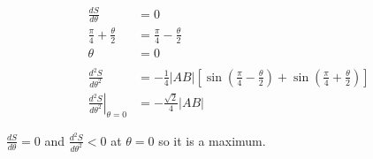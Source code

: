 \documentclass{article}
\begin{document}
\begin{align*}
  \frac{d S}{d \theta}                                 & = 0                                                                                                                                                        \\
  \frac{\pi}{4} + \frac{\theta}{2}                     & = \frac{\pi}{4} - \frac{\theta}{2}                                                                                                                         \\
  \theta                                               & = 0                                                                                                                                                        \\ \\
  \frac{d^2 S}{d \theta^2}                             & = -\frac{1}{4} |AB| \left[ \sin \left( \frac{\pi}{4} - \frac{\theta}{2} \right) + \sin \left( \frac{\pi}{4} + \frac{\theta}{2} \right) \right]             \\
  \left. \frac{d^2 S}{d \theta^2} \right|_{\theta = 0} & = -\frac{\sqrt{2}}{4} |AB|
\end{align*}

$\frac{d S}{d \theta} = 0$ and $\frac{d^2 S}{d \theta^2} < 0$ at $\theta = 0$ so it is a maximum.

\setcounter{subsection}{6}
\subsection{}
\end{document}
